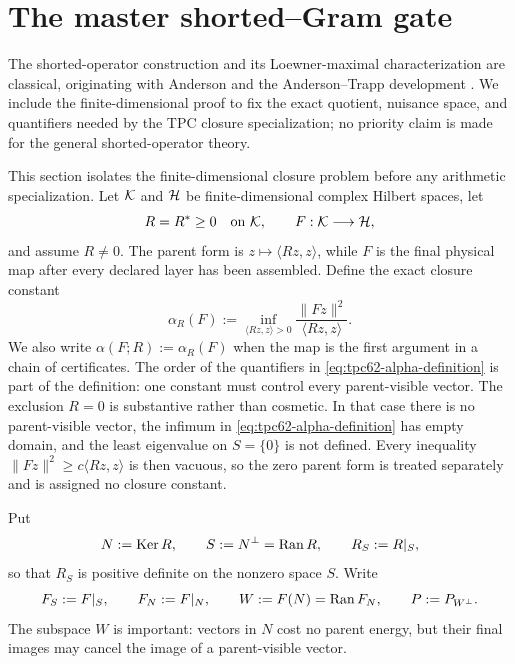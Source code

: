 \section{The master shorted--Gram gate}
\label{sec:tpc62-master-shorted}

The shorted-operator construction and its Loewner-maximal
characterization are classical, originating with Anderson and the
Anderson--Trapp development
\citep{Anderson1971,AndersonTrapp1975}.  We include the finite-dimensional
proof to fix the exact quotient, nuisance space, and quantifiers needed by
the TPC closure specialization; no priority claim is made for the general
shorted-operator theory.

This section isolates the finite-dimensional closure problem before any
arithmetic specialization.  Let \(\mathcal K\) and \(\mathcal H\) be finite-dimensional
complex Hilbert spaces, let
\begin{equation}
 R=R^*\ge 0\quad\text{on }\mathcal K,
 \qquad
 F:\mathcal K\longrightarrow\mathcal H,
 \label{eq:tpc62-master-data}
\end{equation}
and assume \(R\ne0\).  The parent form is
\(z\mapsto\langle Rz,z\rangle\), while \(F\) is the final physical map
after every declared layer has been assembled.  Define the exact closure
constant
\begin{equation}
 \alpha_R(F)
 :=\inf_{\langle Rz,z\rangle>0}
 \frac{\|Fz\|^2}{\langle Rz,z\rangle}.
 \label{eq:tpc62-alpha-definition}
\end{equation}
We also write \(\alpha(F;R):=\alpha_R(F)\) when the map is the first
argument in a chain of certificates.
The order of the quantifiers in \eqref{eq:tpc62-alpha-definition} is part
of the definition: one constant must control every parent-visible vector.
The exclusion \(R=0\) is substantive rather than cosmetic.  In that case
there is no parent-visible vector, the infimum in
\eqref{eq:tpc62-alpha-definition} has empty domain, and the least
eigenvalue on \(S=\{0\}\) is not defined.  Every inequality
\(\|Fz\|^2\ge c\langle Rz,z\rangle\) is then vacuous, so the zero parent
form is treated separately and is assigned no closure constant.

Put
\begin{equation}
 N:=\operatorname{Ker} R,
 \qquad S:=N^\perp=\operatorname{Ran} R,
 \qquad R_S:=R|_S,
 \label{eq:tpc62-master-NSR}
\end{equation}
so that \(R_S\) is positive definite on the nonzero space \(S\).  Write
\begin{equation}
 F_S:=F|_S,
 \qquad F_N:=F|_N,
 \qquad W:=F(N)=\operatorname{Ran} F_N,
 \qquad P:=P_{W^\perp}.
 \label{eq:tpc62-master-FSNWP}
\end{equation}
The subspace \(W\) is important: vectors in \(N\) cost no parent energy,
but their final images may cancel the image of a parent-visible vector.

